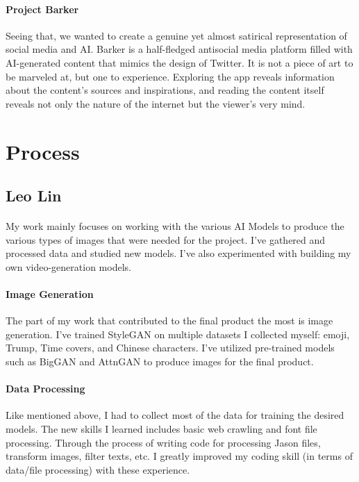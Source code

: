 \documentclass[12pt, letterpaper]{article}
\begin{document}
\paragraph{Project Barker}Seeing that, we wanted to create a genuine yet almost satirical representation of social media and AI. Barker is a half-fledged antisocial media platform filled with AI-generated content that mimics the design of Twitter. It is not a piece of art to be marveled at, but one to experience. Exploring the app reveals information about the content’s sources and inspirations, and reading the content itself reveals not only the nature of the internet but the viewer’s very mind.

\section{Process}

\subsection{Leo Lin}

\paragraph{}My work mainly focuses on working with the various AI Models to produce the various types of images that were needed for the project. I've gathered and processed data and studied new models. I've also experimented with building my own video-generation models.

\paragraph{Image Generation}The part of my work that contributed to the final product the most is image generation. I've trained StyleGAN on multiple datasets I collected myself: emoji, Trump, Time covers, and Chinese characters. I've utilized pre-trained models such as BigGAN and AttnGAN to produce images for the final product. 

\paragraph{Data Processing}Like mentioned above, I had to collect most of the data for training the desired models. The new skills I learned includes basic web crawling and font file processing. Through the process of writing code for processing Jason files, transform images, filter texts, etc. I greatly improved my coding skill (in terms of data/file processing) with these experience.
\end{document}
